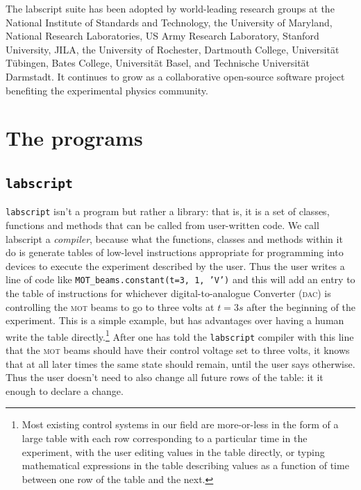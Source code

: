 The labscript suite has been adopted by world-leading research groups at the National Institute of Standards and Technology, the University of Maryland, National Research Laboratories, US Army Research Laboratory, Stanford University, JILA, the University of Rochester, Dartmouth College, Universit\"at T\"ubingen, Bates College, Universit\"at Basel, and Technische Universit\"at Darmstadt. It continues to grow as a collaborative open-source software project benefiting the experimental physics community.


\section{The programs}


\subsection{\texttt{labscript}}

\texttt{labscript} isn't a program but rather a library: that is, it is a set of classes, functions and methods that can be called from user-written code. We call labscript a \emph{compiler}, because what the functions, classes and methods within it do is generate tables of low-level instructions appropriate for programming into devices to execute the experiment described by the user. Thus the user writes a line of code like \hbox{\texttt{MOT\_beams.constant(t=3, 1, 'V')}} and this will add an entry to the table of instructions for whichever digital-to-analogue Converter (\textsc{dac}) is controlling the \textsc{mot} beams to go to three volts at $t = 3\unit{s}$ after the beginning of the experiment. This is a simple example, but has advantages over having a human write the table directly.\footnote{Most existing control systems in our field are more-or-less in the form of a large table with each row corresponding to a particular time in the experiment, with the user editing values in the table directly, or typing mathematical expressions in the table describing values as a function of time between one row of the table and the next.} After one has told the \texttt{labscript} compiler with this line that the \textsc{mot} beams should have their control voltage set to three volts, it knows that at all later times the same state should remain, until the user says otherwise. Thus the user doesn't need to also change all future rows of the table: it it enough to declare a change. 

